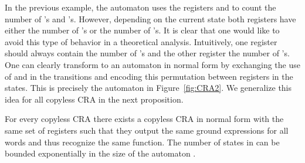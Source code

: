 In the previous example, the automaton  uses the registers  and  to count the number of 's and 's.
However, depending on the current state both registers have either the number of 's or the number of 's. 
It is clear that one would like to avoid this type of behavior in a theoretical analysis. Intuitively, one register should always contain the number of 's and the other register the number of 's.
One can clearly transform  to an automaton in normal form by exchanging the use of  and  in the transitions and encoding this permutation between registers in the states.
This is precisely the automaton  in Figure~\ref{fig:CRA2}. 
We generalize this idea for all copyless CRA in the next proposition.




\begin{proposition}
\label{proposition:normal_form}
	For every copyless CRA  there exists a copyless CRA in normal form  with the same set of registers such that they output the same ground expressions for all words and thus recognize the same function. The number of states in  can be bounded exponentially in the size of the automaton .
\end{proposition}

